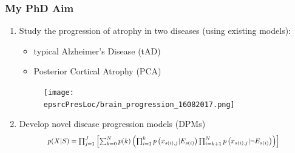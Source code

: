 \documentclass[8pt,xcolor=table,aspectratio=169]{beamer}
\begin{document}
\newcommand{\titleHigh}[1]{{\transparent{1.0}\textbf{#1}}} %
\newcommand{\titleHighTwo}[1]{\underline{\textbf{#1}}} %
\newcommand{\transpLevel}{0.4}

% 
% 
% 



\begin{frame}
\frametitle{My PhD Aim}

\begin{enumerate}
 \item Study the progression of atrophy in two diseases (using existing models): 
 \begin{itemize}
  \item typical Alzheimer's Disease (tAD)
  \item Posterior Cortical Atrophy (PCA)
 \end{itemize}
 
  \begin{figure}
  \centering
  \vspace{1em}
  \texttt{[image: \\epsrcPresLoc/brain\_progression\_16082017.png]}
  \end{figure}
 
 \vspace{1em}

 \item Develop novel disease progression models (DPMs)
  \begin{equation}
  \resizebox{0.8\columnwidth}{!}{%
  $p(X|S) = \prod_{j=1}^J \left[ \sum_{k=0}^N p(k) \left( \prod_{i=1}^k p\left(x_{s(i),j} | E_{s(i)} \right) \prod_{i=k+1}^N p\left(x_{s(i),j} | \neg E_{s(i)}\right) \right) \right]$
  }
  \end{equation}


\end{enumerate}

\end{frame}
\end{document}
